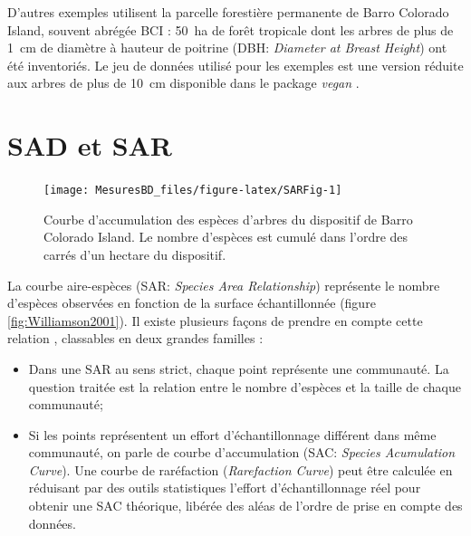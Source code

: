 \documentclass[
  11pt,
  french,
  a4paper,
  extrafontsizes,onecolumn,openright
  ]{memoir}
\providecommand{\tightlist}{%
  \setlength{\itemsep}{0pt}\setlength{\parskip}{0pt}}
\newlength{\rf}
\begin{document}
D'autres exemples utilisent la parcelle forestière permanente de Barro Colorado Island, souvent abrégée BCI \autocite{Condit2012}: 50~ha de forêt tropicale dont les arbres de plus de 1~cm de diamètre à hauteur de poitrine (DBH: \emph{Diameter at Breast Height}) ont été inventoriés.
Le jeu de données utilisé pour les exemples est une version réduite aux arbres de plus de 10~cm disponible dans le package \emph{vegan} \autocite{Oksanen2012}.

\hypertarget{sad-et-sar}{%
\section{SAD et SAR}\label{sad-et-sar}}



\scriptsize

\begin{figure}

{\centering \texttt{[image: MesuresBD\_files/figure-latex/SARFig-1]} 

}

\caption{Courbe d'accumulation des espèces d'arbres du dispositif de Barro Colorado Island. Le nombre d'espèces est cumulé dans l'ordre des carrés d'un hectare du dispositif.}\label{fig:SARFig}
\end{figure}

\normalsize

La courbe aire-espèces (SAR: \emph{Species Area Relationship}) représente le nombre d'espèces observées en fonction de la surface échantillonnée (figure \ref{fig:Williamson2001}).
Il existe plusieurs façons de prendre en compte cette relation \autocite{Scheiner2003}, classables en deux grandes familles \autocite{Dengler2009}:

\begin{itemize}
\tightlist
\item
  Dans une SAR au sens strict, chaque point représente une communauté.
  La question traitée est la relation entre le nombre d'espèces et la taille de chaque communauté;
\item
  Si les points représentent un effort d'échantillonnage différent dans même communauté, on parle de courbe d'accumulation (SAC: \emph{Species Acumulation Curve}). Une courbe de raréfaction (\emph{Rarefaction Curve}) peut être calculée en réduisant par des outils statistiques l'effort d'échantillonnage réel pour obtenir une SAC théorique, libérée des aléas de l'ordre de prise en compte des données.
\end{itemize}
\end{document}
